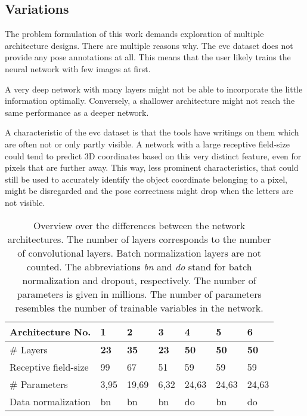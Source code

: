 \subsection{Variations} \label{section:network_variations}

The problem formulation of this work demands exploration of multiple architecture designs. There are multiple reasons why. The \ac{evc} dataset does not provide any pose annotations at all. This means that the user likely trains the neural network with few images at first. 

A very deep network with many layers might not be able to incorporate the little information optimally. Conversely, a shallower architecture might not reach the same performance as a deeper network. 

A characteristic of the \ac{evc} dataset is that the tools have writings on them which are often not or only partly visible. A network with a large receptive field-size could tend to predict 3D coordinates based on this very distinct feature, even for pixels that are further away. This way, less prominent characteristics, that could still be used to accurately identify the object coordinate belonging to a pixel, might be disregarded and the pose correctness might drop when the letters are not visible.

\begin{table}[]
\centering
\begin{tabular}{|l||llllll|}
\hline Architecture No.        & 1          & 2          & 3          & 4          & 5          & 6        \\ \hline\hline
\rowcolor{Gray}
\# Layers               & \textbf{23}         & \textbf{35}         & \textbf{23}         & \textbf{50}         & \textbf{50}         & \textbf{50}       \\
Receptive field-size    & 99         & 67         & 51         & 59         & 59         & 59       \\
\rowcolor{Gray}
\# Parameters & 3,95  & 19,69 & 6,32  & 24,63 & 24,63   & 24,63 \\
Data normalization      & bn & bn & bn & do    & bn & do \\ \hline
\end{tabular}
\caption{Overview over the differences between the network architectures. The number of layers corresponds to the number of convolutional layers. Batch normalization layers are not counted. The abbreviations \textit{bn} and \textit{do} stand for batch normalization and dropout, respectively. The number of parameters is given in millions. The number of parameters resembles the number of trainable variables in the network.}
\label{table:network_architectures}
\end{table}

